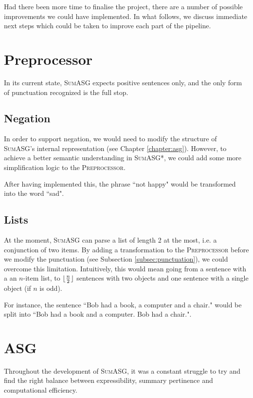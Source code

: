 \label{chapter:improvements}

Had there been more time to finalise the project, there are a number of possible improvements we could have implemented. In what follows, we discuss immediate next steps which could be taken to improve each part of the pipeline.

\section{Preprocessor}

In its current state, \textsc{SumASG} expects positive sentences only, and the only form of punctuation recognized is the full stop.

\subsection{Negation}

In order to support negation, we would need to modify the structure of \textsc{SumASG}'s internal representation (see Chapter \ref{chapter:asg}). However, to achieve a better semantic understanding in \textsc{SumASG*}, we could add some more simplification logic to the \textsc{Preprocessor}.

After having implemented this, the phrase ``not happy" would be transformed into the word ``sad".

\subsection{Lists}

At the moment, \textsc{SumASG} can parse a list of length 2 at the most, i.e. a conjunction of two items. By adding a transformation to the \textsc{Preprocessor} before we modify the punctuation (see Subsection \ref{subsec:punctuation}), we could overcome this limitation. Intuitively, this would mean going from a sentence with a an $n$-item list, to $\lfloor \frac{n}{2} \rfloor$ sentences with two objects and one sentence with a single object (if $n$ is odd).

For instance, the sentence ``Bob had a book, a computer and a chair." would be split into ``Bob had a book and a computer. Bob had a chair.".

\section{ASG}

Throughout the development of \textsc{SumASG}, it was a constant struggle to try and find the right balance between expressibility, summary pertinence and computational efficiency.

